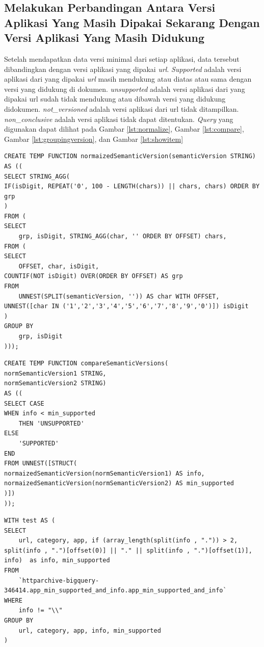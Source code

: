 \subsection{Melakukan Perbandingan Antara Versi Aplikasi Yang Masih Dipakai Sekarang Dengan Versi Aplikasi Yang Masih Didukung} \label{version_compare}
Setelah mendapatkan data versi minimal dari setiap aplikasi, data tersebut dibandingkan dengan versi aplikasi yang dipakai \textit{url}. \textit{Supported} adalah versi aplikasi dari yang dipakai \textit{url} masih mendukung atau diatas atau sama dengan versi yang didukung di dokumen. \textit{unsupported} adalah versi aplikasi dari yang dipakai url sudah tidak mendukung atau dibawah versi yang didukung didokumen. \textit{not\_versioned} adalah versi aplikasi dari url tidak ditampilkan. \textit{non\_conclusive} adalah versi aplikasi tidak dapat ditentukan. \textit{Query} yang digunakan dapat dilihat pada Gambar \ref{lst:normalize}, Gambar \ref{lst:compare}, Gambar \ref{lst:groupingversion}, dan Gambar \ref{lst:showitem}
\begin{lstlisting}[caption={Normalize Semantic Version}, label={lst:normalize}]
CREATE TEMP FUNCTION normaizedSemanticVersion(semanticVersion STRING) 
AS ((
SELECT STRING_AGG(
IF(isDigit, REPEAT('0', 100 - LENGTH(chars)) || chars, chars) ORDER BY grp 
)
FROM (
SELECT 
	grp, isDigit, STRING_AGG(char, '' ORDER BY OFFSET) chars,
FROM (
SELECT 
	OFFSET, char, isDigit,
COUNTIF(NOT isDigit) OVER(ORDER BY OFFSET) AS grp
FROM 
	UNNEST(SPLIT(semanticVersion, '')) AS char WITH OFFSET, 
UNNEST([char IN ('1','2','3','4','5','6','7','8','9','0')]) isDigit
)
GROUP BY 
	grp, isDigit
)));
\end{lstlisting}

\begin{lstlisting}[caption={Compare Semantic Version}, label={lst:compare}]
CREATE TEMP FUNCTION compareSemanticVersions(
normSemanticVersion1 STRING, 
normSemanticVersion2 STRING) 
AS ((
SELECT CASE 
WHEN info < min_supported 
	THEN 'UNSUPPORTED'
ELSE 
	'SUPPORTED'
END
FROM UNNEST([STRUCT(
normaizedSemanticVersion(normSemanticVersion1) AS info, 
normaizedSemanticVersion(normSemanticVersion2) AS min_supported
)])
));
	\end{lstlisting}

\begin{lstlisting}[caption={Membuat Tabel Sementara untuk Grouping Version}, label={lst:groupingversion}]
WITH test AS (
SELECT 
	url, category, app, if (array_length(split(info , ".")) > 2, split(info , ".")[offset(0)] || "." || split(info , ".")[offset(1)], info)  as info, min_supported	
FROM
	`httparchive-bigquery-346414.app_min_supported_and_info.app_min_supported_and_info`
WHERE 
	info != "\\"
GROUP BY 
	url, category, app, info, min_supported
)
	\end{lstlisting}

